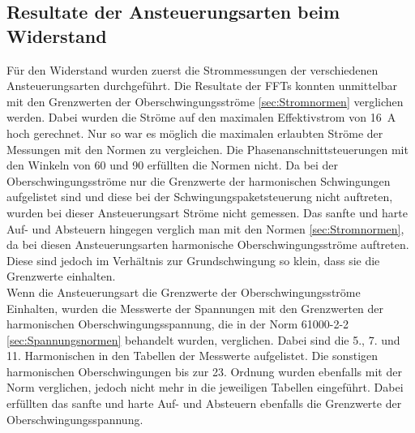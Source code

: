 \subsection{Resultate der Ansteuerungsarten beim Widerstand}
Für den Widerstand wurden zuerst die Strommessungen der verschiedenen Ansteuerungsarten durchgeführt. Die Resultate der FFTs konnten unmittelbar mit den Grenzwerten der Oberschwingungsströme \ref{sec:Stromnormen} verglichen werden. Dabei wurden die Ströme auf den maximalen Effektivstrom von \SI{16}{A} hoch gerechnet. Nur so war es möglich die maximalen erlaubten Ströme der Messungen mit den Normen zu vergleichen. Die Phasenanschnittsteuerungen mit den Winkeln von 60\textdegree \hspace{0.02cm} und 90\textdegree \hspace{0.02cm} erfüllten die Normen nicht. Da bei der Oberschwingungsströme nur die Grenzwerte der harmonischen Schwingungen aufgelistet sind und diese bei der Schwingungspaketsteuerung nicht auftreten, wurden bei dieser Ansteuerungsart Ströme nicht gemessen. Das sanfte und harte Auf- und Absteuern hingegen verglich man mit den Normen \ref{sec:Stromnormen}, da bei diesen Ansteuerungsarten harmonische Oberschwingungsströme auftreten. Diese sind jedoch im Verhältnis zur Grundschwingung so klein, dass sie die Grenzwerte einhalten.\\ 

Wenn die Ansteuerungsart die Grenzwerte der Oberschwingungsströme Einhalten, wurden die Messwerte der Spannungen mit den Grenzwerten der harmonischen Oberschwingungsspannung, die in der Norm 61000-2-2 \ref{sec:Spannungsnormen} behandelt wurden, verglichen. Dabei sind die 5., 7. und 11. Harmonischen in den Tabellen der Messwerte aufgelistet. Die sonstigen harmonischen Oberschwingungen bis zur 23. Ordnung wurden ebenfalls mit der Norm verglichen, jedoch nicht mehr in die jeweiligen Tabellen eingeführt. Dabei erfüllten das sanfte und harte Auf- und Absteuern ebenfalls die Grenzwerte der Oberschwingungsspannung.\\

